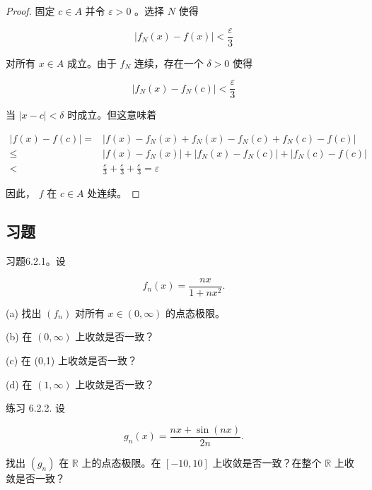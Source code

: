 \begin{proof}
固定 \(c \in  A\) 并令 \(\varepsilon  > 0\) 。选择 \(N\) 使得

\[
\left| {{f}_{N}\left( x\right)  - f\left( x\right) }\right|  < \frac{\varepsilon }{3}
\]

对所有 \(x \in  A\) 成立。由于 \({f}_{N}\) 连续，存在一个 \(\delta  > 0\) 使得

\[
\left| {{f}_{N}\left( x\right)  - {f}_{N}\left( c\right) }\right|  < \frac{\varepsilon }{3}
\]

当 \(\left| {x - c}\right|  < \delta\) 时成立。但这意味着

\begin{align*}
\left| {f\left( x\right)  - f\left( c\right) }\right|  = & \left| {f\left( x\right)  - {f}_{N}\left( x\right)  + {f}_{N}\left( x\right)  - {f}_{N}\left( c\right)  + {f}_{N}\left( c\right)  - f\left( c\right) }\right|\\
\leq & \left| {f\left( x\right)  - {f}_{N}\left( x\right) }\right|  + \left| {{f}_{N}\left( x\right)  - {f}_{N}\left( c\right) }\right|  + \left| {{f}_{N}\left( c\right)  - f\left( c\right) }\right|\\
< & \frac{\varepsilon }{3} + \frac{\varepsilon }{3} + \frac{\varepsilon }{3} = \varepsilon
\end{align*}


因此， \(f\) 在 \(c \in  A\) 处连续。
  
\end{proof}

\subsection{习题}

习题6.2.1。设

\[
{f}_{n}\left( x\right)  = \frac{nx}{1 + n{x}^{2}}.
\]

(a) 找出 \(\left( {f}_{n}\right)\) 对所有 \(x \in  \left( {0,\infty }\right)\) 的点态极限。

(b) 在 \(\left( {0,\infty }\right)\) 上收敛是否一致？

(c) 在 (0,1) 上收敛是否一致？

(d) 在 \(\left( {1,\infty }\right)\) 上收敛是否一致？

练习 6.2.2. 设

\[
{g}_{n}\left( x\right)  = \frac{{nx} + \sin \left( {nx}\right) }{2n}.
\]

找出 \(\left( {g}_{n}\right)\) 在 \(\mathbb{R}\) 上的点态极限。在 \(\left\lbrack  {-{10},{10}}\right\rbrack\) 上收敛是否一致？在整个 \(\mathbb{R}\) 上收敛是否一致？

